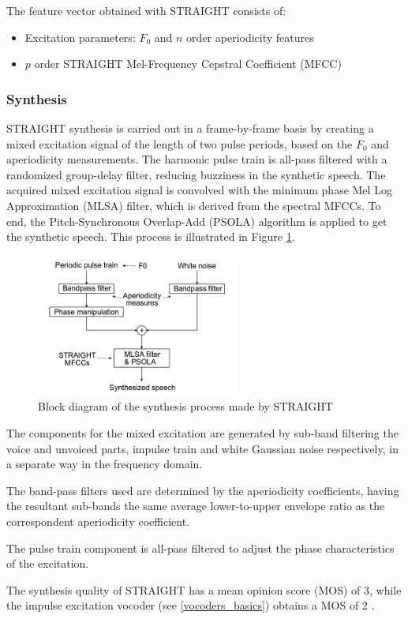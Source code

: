 The feature vector obtained with STRAIGHT consists of:

\begin{itemize}
	\item Excitation parameters: $F_{0}$ and $n$ order aperiodicity features
	\item $p$ order STRAIGHT Mel-Frequency Cepstral Coefficient (MFCC)
\end{itemize}

\subsubsection{Synthesis}
\label{vocoders_straight_synthesis}
STRAIGHT synthesis is carried out in a frame-by-frame basis by creating a mixed excitation signal of the length of two pulse periods, based on the $F_{0}$ and aperiodicity measurements.
%
The harmonic pulse train is all-pass filtered with a randomized group-delay filter, reducing buzziness in the synthetic speech.
%
The acquired mixed excitation signal is convolved with the minimum phase Mel Log Approximation (MLSA) filter, which is derived from the spectral MFCCs.
%
To end, the Pitch-Synchronous Overlap-Add (PSOLA) algorithm \cite{moulines1990pitch} is applied to get the synthetic speech.
%
This process is illustrated in Figure \ref{fig:straight_synthesis}.

\begin{figure}[!htb]
\begin{centering}
\includegraphics[width=0.6\textwidth]{images/straight_synthesis.jpg}
\caption{Block diagram of the synthesis process made by STRAIGHT \cite{manuMSc}}
\label{fig:straight_synthesis}
\end{centering}
\end{figure}

The components for the mixed excitation are generated by sub-band filtering the voice and unvoiced parts, impulse train and white Gaussian noise respectively, in a separate way in the frequency domain.

The band-pass filters used are determined by the aperiodicity coefficients, having the resultant sub-bands the same average lower-to-upper envelope ratio as the correspondent aperiodicity coefficient.

The pulse train component is all-pass filtered to adjust the phase characteristics of the excitation.

The synthesis quality of STRAIGHT has a mean opinion score (MOS) of 3, while the impulse excitation vocoder (see \ref{vocoders_basics}) obtains a MOS of 2 \cite{karhila_jstsp_14}.